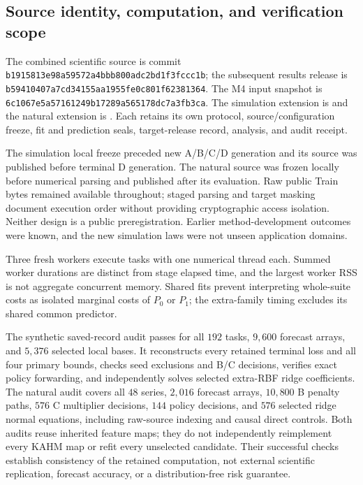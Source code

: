 \subsection{Source identity, computation, and verification scope}

The combined scientific source is commit
\texttt{b1915813e98a59572a4bbb800adc2bd1f3fccc1b}; the subsequent
results release is
\texttt{b59410407a7cd34155aa1955fe0c801f62381364}.
The M4 input snapshot is
\texttt{6c1067e5a57161249b17289a565178dc7a3fb3ca}.
The simulation extension is 
and the natural extension is
.
Each retains its own protocol, source/configuration freeze, fit and
prediction seals, target-release record, analysis, and audit receipt.

The simulation local freeze preceded new A/B/C/D generation and its
source was published before terminal D generation. The natural source
was frozen locally before numerical parsing and published after its
evaluation. Raw public Train bytes remained available throughout;
staged parsing and target masking document execution order without
providing cryptographic access isolation. Neither design is a public
preregistration. Earlier method-development outcomes were known, and
the new simulation laws were not unseen application domains.

\begin{table}[t]
\centering\small
\caption{Recorded whole-suite resources, including rejected and
diagnostic candidates. Worker times sum concurrent work; peak RSS is
the largest individual worker measurement. Complete compressed fitting
records are not minimal deployed-model sizes.}
\label{supp:pa-resources}

\end{table}

Three fresh workers execute tasks with one numerical thread each.
Summed worker durations are distinct from stage elapsed time, and the
largest worker RSS is not aggregate concurrent memory. Shared fits
prevent interpreting whole-suite costs as isolated marginal costs of
$P_0$ or $P_1$; the extra-family timing excludes its shared common
predictor.

The synthetic saved-record audit passes for all $192$ tasks, $9,600$
forecast arrays, and $5,376$ selected local bases. It reconstructs every
retained terminal loss and all four primary bounds, checks seed
exclusions and B/C decisions, verifies exact policy forwarding, and
independently solves selected extra-RBF ridge coefficients. The natural
audit covers all $48$ series, $2,016$ forecast arrays, $10,800$ B
penalty paths, $576$ C multiplier decisions, $144$ policy decisions,
and $576$ selected ridge normal equations, including raw-source
indexing and causal direct controls. Both audits reuse inherited feature
maps; they do not independently reimplement every KAHM map or refit
every unselected candidate. Their successful checks establish
consistency of the retained computation, not external scientific
replication, forecast accuracy, or a distribution-free risk guarantee.
